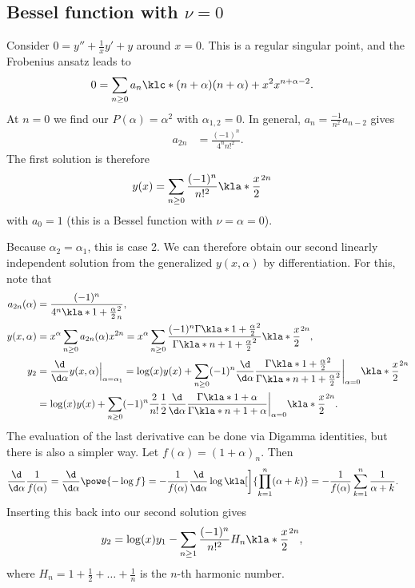 \documentclass[english, parskip=full]{scrartcl}
\begin{document}
\subsection{Bessel function with $\nu=0$}
Consider $0=y'' + \frac{1}{x}y' + y$ around $x=0$.
This is a regular singular point, and the Frobenius ansatz leads to
\begin{align}
0 &= \sum_{n\ge 0} a_n \klc*{(n+\alpha)(n+\alpha) + x^2} x^{n+\alpha-2}.
\end{align}
At $n=0$ we find our $P(\alpha)=\alpha^2$ with $\alpha_{1,2} = 0$.
In general, $a_n = \frac{-1}{n^2} a_{n-2}$ gives
\begin{align}
a_{2n} &= \frac{(-1)^n}{4^n n!^2}.
\end{align}
The first solution is therefore
\begin{align}
y(x) &= \sum_{n\ge 0} \frac{(-1)^n}{n!^2} \kla*{\frac{x}{2}}^{2n}
\end{align}
with $a_0 = 1$ (this is a Bessel function with $\nu=\alpha=0$).

Because $\alpha_2=\alpha_1$, this is case 2.
We can therefore obtain our second linearly independent solution from the generalized $y(x,\alpha)$ by differentiation.
For this, note that
\begin{align}
a_{2n}(\alpha) &= \frac{(-1)^n}{4^n \kla*{1+\frac{\alpha}{2}}_n^2},\\
y(x,\alpha) &= x^\alpha \sum_{n\ge 0} a_{2n}(\alpha) x^{2n} = x^\alpha \sum_{n\ge 0} \frac{(-1)^n \Gamma\kla*{1+\frac{\alpha}{2}}^2}{\Gamma\kla*{n+1+\frac{\alpha}{2}}^2} \kla*{\frac{x}{2}}^{2n},\\
y_2 &= \frac{\d}{\d \alpha} y(x,\alpha) \Big\vert_{\alpha=\alpha_1} = \log(x) y(x) + \sum_{n\ge 0} (-1)^n \frac{\d}{\d \alpha} \frac{\Gamma\kla*{1+\frac{\alpha}{2}}^2}{\Gamma\kla*{n+1+\frac{\alpha}{2}}^2} \bigg\vert_{\alpha=0} \kla*{\frac{x}{2}}^{2n}\\
&= \log(x)y(x) + \sum_{n\ge 0} (-1)^n \frac{2}{n!} \frac{1}{2} \frac{\d}{\d \alpha} \frac{\Gamma\kla*{1+\alpha}}{\Gamma\kla*{n+1+\alpha}} \bigg\vert_{\alpha=0} \kla*{\frac{x}{2}}^{2n}.
\end{align}
The evaluation of the last derivative can be done via Digamma identities, but there is also a simpler way.
Let $f(\alpha) = (1+\alpha)_n$.
Then
\begin{align}
\frac{\d}{\d\alpha} \frac{1}{f(\alpha)} &= \frac{\d}{\d\alpha} \powe{-\log f} = -\frac{1}{f(\alpha)} \frac{\d}{\d\alpha} \log \kla[\bigg]{\prod_{k=1}^{n} (\alpha + k)} = -\frac{1}{f(\alpha)} \sum_{k=1}^{n} \frac{1}{\alpha + k}.
\end{align}
Inserting this back into our second solution gives
\begin{align}
y_2 &= \log(x)y_1 - \sum_{n\ge 1} \frac{(-1)^n}{n!^2} H_n \kla*{\frac{x}{2}}^{2n},
\end{align}
where $H_n = 1 + \frac{1}{2} + \dots + \frac{1}{n}$ is the $n$-th harmonic number.
\end{document}
